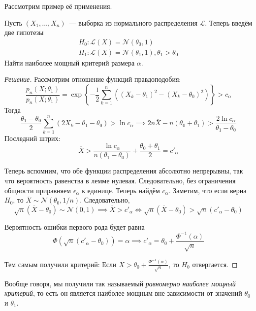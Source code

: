 Рассмотрим пример её применения.
\begin{problem}
	Пусть \((X_{1}, \dots, X_{n})\)~--- выборка из нормального распределения 
	\(\mathcal{L}\). Теперь введём две гипотезы
	\begin{gather*}
		H_{0} : \mathcal{L}(X) = \mathcal{N}(\theta_{0}, 1) \\
		H_{1} : \mathcal{L}(X) = \mathcal{N}(\theta_{1}, 1), \theta_{1} > 
		\theta_{0}
	\end{gather*}
	Найти наиболее мощный критерий размера \(\alpha\).
\end{problem}
\begin{proof}[Решение]
	Рассмотрим отношение функций правдоподобия:
	\[
		\frac{p_{n}(X; \theta_{1})}{p_{n}(X; \theta_{1})} = 
		\exp\left\{-\frac{1}{2}\sum_{k = 1}^{n}\left((X_{k} - \theta_{1})^{2} - 
		(X_{k} - \theta_{0})^{2}\right)\right\} > c_{\alpha}
	\]
	Тогда
	\[
		\frac{\theta_{1} - \theta_{0}}{2}\sum_{k = 1}^{n}(2X_{k} - \theta_{1} - 
		\theta_{0}) > \ln{c_{\alpha}} \implies 2n\overline{X} - n(\theta_{0} + 
		\theta_{1}) > \frac{2\ln{c_{\alpha}}}{\theta_{1} - \theta_{0}}
	\]
	Последний штрих:
	\[
		\overline{X} > \frac{\ln{c_\alpha}}{n(\theta_{1} - \theta_{0})} + 
		\frac{\theta_{0} + \theta_{1}}{2} = c'_{\alpha}
	\]
	
	Теперь вспомним, что обе функции распределения абсолютно непрерывны, так 
	что вероятность равенства в лемме нулевая. Следовательно, без ограничения 
	общности приравняем \(\epsilon_{\alpha}\) к единице. Теперь найдём 
	\(c_{\alpha}\). Заметим, что если верна \(H_{0}\), то \(\overline{X} \sim 
	\mathcal{N}(\theta_{0}, 1/n)\). Следовательно,
	\[
		\sqrt{n}(\overline{X} - \theta_{0}) \sim \mathcal{N}(0, 1) \implies 
		\overline{X} > c'_{\alpha} \iff \sqrt{n}(\overline{X} - \theta_{0}) > 
		\sqrt{n}(c'_{\alpha} - \theta_{0})
	\]
	
	Вероятность ошибки первого рода будет равна
	\[
		\Phi(\sqrt{n}(c'_{\alpha} - \theta_{0})) = \alpha \implies c'_{\alpha} 
		= \theta_{0} + \frac{\Phi^{-1}(\alpha)}{\sqrt{n}}
	\]
	
	Тем самым получили критерий: Если \(\overline{X} > \theta_{0} + 
	\frac{\Phi^{-1}(\alpha)}{\sqrt{n}}\), то \(H_{0}\) отвергается.
\end{proof}

Вообще говоря, мы получили так называемый \emph{равномерно наиболее мощный 
критерий}, то есть он является наиболее мощным вне зависимости от значений 
\(\theta_{0}\) и \(\theta_{1}\).